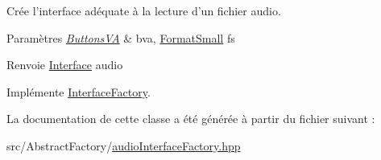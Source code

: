Crée l'interface adéquate à la lecture d'un fichier audio. 


\begin{DoxyParams}{Paramètres}
{\em \hyperlink{classButtonsVA}{Buttons\+V\+A}} & bva, \hyperlink{classFormatSmall}{Format\+Small} fs \\
\hline
\end{DoxyParams}
\begin{DoxyReturn}{Renvoie}
\hyperlink{classInterface}{Interface} audio 
\end{DoxyReturn}


Implémente \hyperlink{classInterfaceFactory_a043c593647071e277c897a5416221de0}{Interface\+Factory}.



La documentation de cette classe a été générée à partir du fichier suivant \+:\begin{DoxyCompactItemize}
\item 
src/\+Abstract\+Factory/\hyperlink{audioInterfaceFactory_8hpp}{audio\+Interface\+Factory.\+hpp}\end{DoxyCompactItemize}
